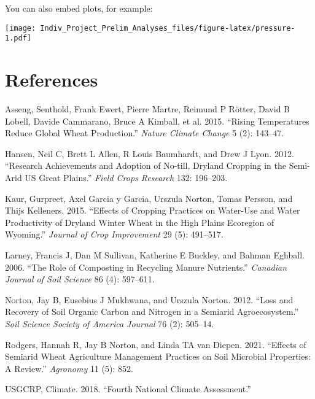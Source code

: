 \documentclass[
]{article}
\newlength{\cslhangindent}
\newlength{\cslentryspacingunit} %
\newenvironment{CSLReferences}[2] %
 {%
  \setlength{\parindent}{0pt}
  \ifodd #1
  \let\oldpar\par
  \def\par{\hangindent=\cslhangindent\oldpar}
  \fi
  \setlength{\parskip}{#2\cslentryspacingunit}
 }%
 {}
\begin{document}
You can also embed plots, for example:

\texttt{[image: Indiv\_Project\_Prelim\_Analyses\_files/figure-latex/pressure-1.pdf]}

\hypertarget{references}{%
\section*{References}\label{references}}

\hypertarget{refs}{}
\begin{CSLReferences}{1}{0}
\leavevmode{}%
Asseng, Senthold, Frank Ewert, Pierre Martre, Reimund P Rötter, David B
Lobell, Davide Cammarano, Bruce A Kimball, et al. 2015. {``Rising
Temperatures Reduce Global Wheat Production.''} \emph{Nature Climate
Change} 5 (2): 143--47.

\leavevmode{}%
Hansen, Neil C, Brett L Allen, R Louis Baumhardt, and Drew J Lyon. 2012.
{``Research Achievements and Adoption of No-till, Dryland Cropping in
the Semi-Arid US Great Plains.''} \emph{Field Crops Research} 132:
196--203.

\leavevmode{}%
Kaur, Gurpreet, Axel Garcia y Garcia, Urszula Norton, Tomas Persson, and
Thijs Kelleners. 2015. {``Effects of Cropping Practices on Water-Use and
Water Productivity of Dryland Winter Wheat in the High Plains Ecoregion
of Wyoming.''} \emph{Journal of Crop Improvement} 29 (5): 491--517.

\leavevmode{}%
Larney, Francis J, Dan M Sullivan, Katherine E Buckley, and Bahman
Eghball. 2006. {``The Role of Composting in Recycling Manure
Nutrients.''} \emph{Canadian Journal of Soil Science} 86 (4): 597--611.

\leavevmode{}%
Norton, Jay B, Eusebius J Mukhwana, and Urszula Norton. 2012. {``Loss
and Recovery of Soil Organic Carbon and Nitrogen in a Semiarid
Agroecosystem.''} \emph{Soil Science Society of America Journal} 76 (2):
505--14.

\leavevmode{}%
Rodgers, Hannah R, Jay B Norton, and Linda TA van Diepen. 2021.
{``Effects of Semiarid Wheat Agriculture Management Practices on Soil
Microbial Properties: A Review.''} \emph{Agronomy} 11 (5): 852.

\leavevmode{}%
USGCRP, Climate. 2018. {``Fourth National Climate Assessment.''}

\end{CSLReferences}
\end{document}
